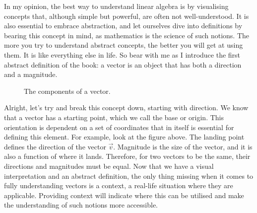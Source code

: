 \documentclass[a4,12pt,twosided,openany]{memoir}
\begin{document}
In my opinion, the best way to understand linear algebra is by visualising concepts that, although simple but powerful, are often not well-understood. It is also essential to embrace abstraction, and let ourselves dive into definitions by bearing this concept in mind, as mathematics is the science of such notions. The more you try to understand abstract concepts, the better you will get at using them. It is like everything else in life. So bear with me as I introduce the first abstract definition of the book: a vector is an object that has both a direction and a magnitude.
\begin{figure}[h!]
\begin{center}
\end{center}
\caption{The components of a vector.}\label{fig:vectorcomponents}
\end{figure}
\par 
\indent
Alright, let’s try and break this concept down, starting with direction. We know that a vector has a starting point, which we call the base or origin. This orientation is dependent on a set of coordinates that in itself is essential for defining this element. For example, look at the figure above. The landing point defines the direction of the vector $\overrightarrow{v}$. Magnitude is the size of the vector, and it is also a function of where it lands. Therefore, for two vectors to be the same, their directions and magnitudes must be equal. Now that we have a visual interpretation and an abstract definition, the only thing missing when it comes to fully understanding vectors is a context, a real-life situation where they are applicable. Providing context will indicate where this can be utilised and make the understanding of such notions more accessible. 
\end{document}
